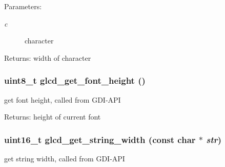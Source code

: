 \begin{Desc}
\item[Parameters:]
\begin{description}
\item[{\em c}]character \end{description}
\end{Desc}
\begin{Desc}
\item[Returns:]width of character \end{Desc}
\hypertarget{group__graphic__device__font_g98c36633bb1b0db1ac26c4b07a392d2c}{
\subsubsection[{glcd\_\-get\_\-font\_\-height}]{\setlength{\rightskip}{0pt plus 5cm}uint8\_\-t glcd\_\-get\_\-font\_\-height ()}}
\label{group__graphic__device__font_g98c36633bb1b0db1ac26c4b07a392d2c}


get font height, called from GDI-API 

\begin{Desc}
\item[Returns:]height of current font \end{Desc}
\hypertarget{group__graphic__device__font_g7139ef355833e99644e2149b6e908759}{
\subsubsection[{glcd\_\-get\_\-string\_\-width}]{\setlength{\rightskip}{0pt plus 5cm}uint16\_\-t glcd\_\-get\_\-string\_\-width (const char $\ast$ {\em str})}}
\label{group__graphic__device__font_g7139ef355833e99644e2149b6e908759}


get string width, called from GDI-API 

